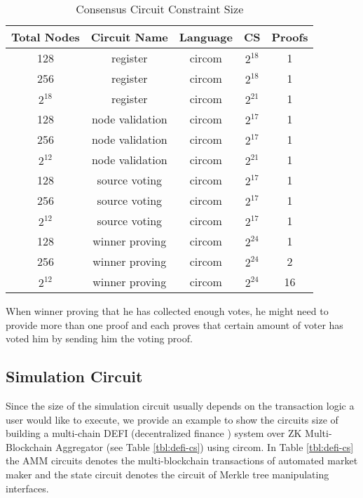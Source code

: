 \begin{table}[!ht]
\small
\centering
\caption{Consensus Circuit Constraint Size}
\label{tbl:consensus-cs}
\begin{tabular}{ | c | c | c | c | c | }
\hline
Total Nodes & Circuit Name & Language & CS & Proofs \\
\hline
128 & register & circom & $2^{18}$ & 1\\
\hline
256 & register & circom & $2^{18}$ & 1\\
\hline
$2^{18}$ & register & circom & $2^{21}$ & 1\\
\hline
128 & node validation & circom & $2^{17}$ & 1\\
\hline
256 & node validation & circom & $2^{17}$ & 1\\
\hline
$2^{12}$ & node validation & circom & $2^{21}$ & 1 \\
\hline
128 & source voting & circom & $2^{17}$ & 1\\
\hline
256 & source voting & circom & $2^{17}$ & 1\\
\hline
$2^{12}$ & source voting & circom & $2^{17}$ & 1\\
\hline
128 & winner proving & circom & $2^{24}$ & 1\\
\hline
256 & winner proving & circom & $2^{24}$ & 2 \\
\hline
$2^{12}$ & winner proving & circom & $2^{24}$ & 16 \\
\hline
\end{tabular}
\end{table}
\begin{remark}
When winner proving that he has collected enough votes, he might need to provide more than one proof and each proves that certain amount of voter has voted him by sending him the voting proof.
\end{remark}

\subsection{Simulation Circuit}
Since the size of the simulation circuit usually depends on the transaction logic a user would like to execute, we provide an example to show the circuits size of building a multi-chain DEFI (decentralized finance \cite{zetzsche2020decentralized, chen2020blockchain}) system over ZK Multi-Blockchain Aggregator (see Table \ref{tbl:defi-cs}) using circom. In Table \ref{tbl:defi-cs} the AMM circuits denotes the multi-blockchain transactions of automated market maker \cite{mohan2022automated} and the state circuit denotes the circuit of Merkle tree manipulating interfaces. 


